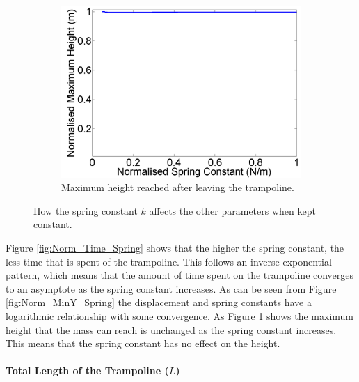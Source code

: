 \begin{figure}[H]
\begin{subfigure}[t]{0.3\textwidth}
		\includegraphics[width=\textwidth]{Norm_Height_Spring.png}
    	\caption{Maximum height reached after leaving the trampoline.}\label{fig:Norm_Height_Spring}
    \end{subfigure}\hfill
    \caption{How the spring constant $k$ affects the other parameters when kept constant.}\label{fig:Norm_Spring}
\end{figure}

\noindent Figure \ref{fig:Norm_Time_Spring} shows that the higher the spring constant, the less time that is spent of the trampoline. This follows an inverse exponential pattern, which means that the amount of time spent on the trampoline converges to an asymptote as the spring constant increases. 
As can be seen from Figure \ref{fig:Norm_MinY_Spring} the displacement and spring constants have a logarithmic relationship with some convergence.
As Figure \ref{fig:Norm_Height_Spring} shows the maximum height that the mass can reach is unchanged as the spring constant increases. This means that the spring constant has no effect on the height. 


\paragraph{Total Length of the Trampoline ($L$)}\mbox{}\\

